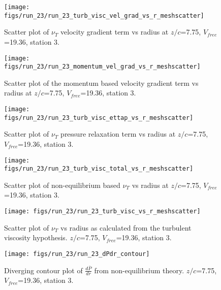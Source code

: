 \begin{figure}[H]
\centering
\texttt{[image: figs/run\_23/run\_23\_turb\_visc\_vel\_grad\_vs\_r\_meshscatter]}
\caption{Scatter plot of $\nu_T$ velocity gradient term vs radius at $z/c$=7.75, $V_{free}$=19.36, station 3.}
\end{figure}


\begin{figure}[H]
\centering
\texttt{[image: figs/run\_23/run\_23\_momentum\_vel\_grad\_vs\_r\_meshscatter]}
\caption{Scatter plot of the momentum based velocity gradient term vs radius at $z/c$=7.75, $V_{free}$=19.36, station 3.}
\end{figure}


\begin{figure}[H]
\centering
\texttt{[image: figs/run\_23/run\_23\_turb\_visc\_ettap\_vs\_r\_meshscatter]}
\caption{Scatter plot of $\nu_T$ pressure relaxation term vs radius at $z/c$=7.75, $V_{free}$=19.36, station 3.}
\end{figure}


\begin{figure}[H]
\centering
\texttt{[image: figs/run\_23/run\_23\_turb\_visc\_total\_vs\_r\_meshscatter]}
\caption{Scatter plot of non-equilibrium based $\nu_T$ vs radius at $z/c$=7.75, $V_{free}$=19.36, station 3.}
\end{figure}


\begin{figure}[H]
\centering
\texttt{[image: figs/run\_23/run\_23\_turb\_visc\_vs\_r\_meshscatter]}
\caption{Scatter plot of $\nu_T$ vs radius as calculated from the turbulent viscosity hypothesis. $z/c$=7.75, $V_{free}$=19.36, station 3.}
\end{figure}


\begin{figure}[H]
\centering
\texttt{[image: figs/run\_23/run\_23\_dPdr\_contour]}
\caption{Diverging contour plot of $\frac{d\bar{P}}{dr}$ from non-equilibrium theory. $z/c$=7.75, $V_{free}$=19.36, station 3.}
\end{figure}


